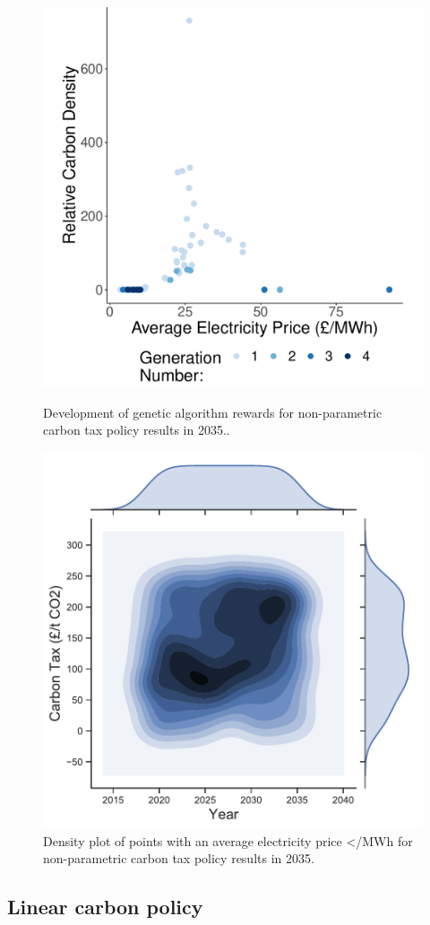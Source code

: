 \documentclass[sigconf]{acmart}
\begin{document}
\begin{figure}
\centering
\includegraphics[width=0.72\linewidth]{figures/results/free_points_ga_development}
\caption{Development of genetic algorithm rewards for non-parametric carbon tax policy results in 2035..}
\label{fig:free_points_ga_development}
%
\includegraphics[width=0.71\linewidth]{figures/results/best_heatmap_no_marginals}
\caption{Density plot of points with an average electricity price </MWh for non-parametric carbon tax policy results in 2035.}
\label{fig:heatmap_of_free_points}
\end{figure}



\subsection{Linear carbon policy}
\label{sssec:result_linear_carbon_strategy}
\end{document}
